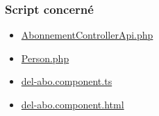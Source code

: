 \subsubsection{Script concerné}
	\begin{itemize}
		\item \href{https://github.com/victorsmits/Aquabike/blob/master/backend/src/Controller/API/AbonnementControllerApi.php}{AbonnementControllerApi.php}
		\item \href{https://github.com/victorsmits/Aquabike/blob/master/backend/src/Entity/Person.php}{Person.php}
		\item \href{https://github.com/victorsmits/Aquabike/blob/master/frontend/src/app/type-session/del-abo.component.ts}{del-abo.component.ts}
		\item \href{https://github.com/victorsmits/Aquabike/blob/master/frontend/src/app/type-session/del-abo.component.html}{del-abo.component.html}
	\end{itemize}
